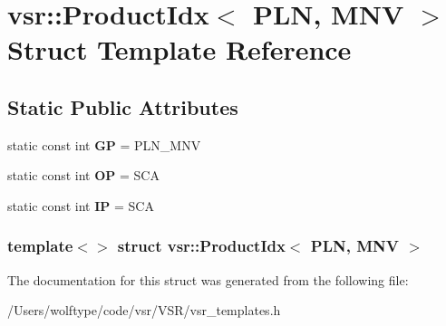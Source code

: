 \hypertarget{structvsr_1_1_product_idx_3_01_p_l_n_00_01_m_n_v_01_4}{\section{vsr\-:\-:Product\-Idx$<$ P\-L\-N, M\-N\-V $>$ Struct Template Reference}
\label{structvsr_1_1_product_idx_3_01_p_l_n_00_01_m_n_v_01_4}
}
\subsection*{Static Public Attributes}
\begin{DoxyCompactItemize}
\item 
\hypertarget{structvsr_1_1_product_idx_3_01_p_l_n_00_01_m_n_v_01_4_a6f2da2b1e692b08321d949a3eac2576a}{static const int {\bfseries G\-P} = P\-L\-N\-\_\-\-M\-N\-V}\label{structvsr_1_1_product_idx_3_01_p_l_n_00_01_m_n_v_01_4_a6f2da2b1e692b08321d949a3eac2576a}

\item 
\hypertarget{structvsr_1_1_product_idx_3_01_p_l_n_00_01_m_n_v_01_4_a8e89b417aec2395bc7fdf27ca1bef676}{static const int {\bfseries O\-P} = S\-C\-A}\label{structvsr_1_1_product_idx_3_01_p_l_n_00_01_m_n_v_01_4_a8e89b417aec2395bc7fdf27ca1bef676}

\item 
\hypertarget{structvsr_1_1_product_idx_3_01_p_l_n_00_01_m_n_v_01_4_a3dcffaa2e0a16abb839c6182311c66e4}{static const int {\bfseries I\-P} = S\-C\-A}\label{structvsr_1_1_product_idx_3_01_p_l_n_00_01_m_n_v_01_4_a3dcffaa2e0a16abb839c6182311c66e4}

\end{DoxyCompactItemize}
\subsubsection*{template$<$$>$ struct vsr\-::\-Product\-Idx$<$ P\-L\-N, M\-N\-V $>$}



The documentation for this struct was generated from the following file\-:\begin{DoxyCompactItemize}
\item 
/\-Users/wolftype/code/vsr/\-V\-S\-R/vsr\-\_\-templates.\-h\end{DoxyCompactItemize}
